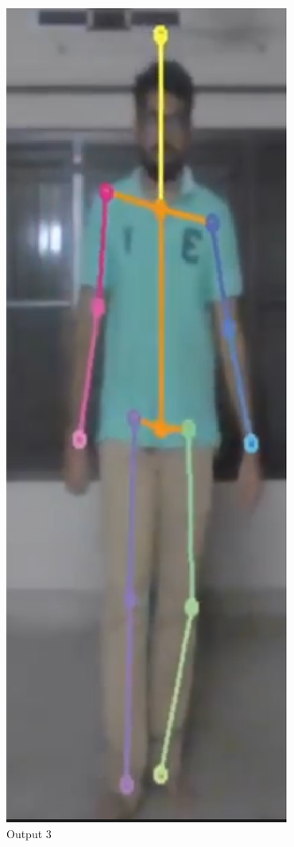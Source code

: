 \documentclass{fisatprojectfinal}
\begin{document}
\begin{figure}[h!]
	\begin{center}
	\includegraphics[scale=0.7]{pose-3}
	\caption{Output 3}
\end{center}
\end{figure}
\end{document}
